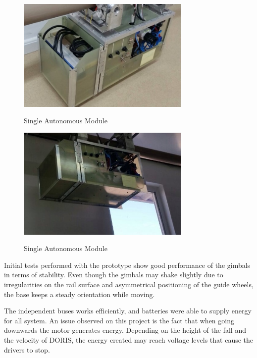 \documentclass{ifacconf}
\begin{document}
\begin{figure}[!h]
\begin{center}
\includegraphics[width=8.4cm]{figs/SAM1.jpg}  %
\label{fig:SAM}
\caption{Single Autonomous Module}
\end{center}
\end{figure}
\begin{figure}[!h]
\begin{center}
\includegraphics[width=8.4cm]{figs/SAM2.jpg}  %
\label{fig:SAM2}
\caption{Single Autonomous Module}
\end{center}
\end{figure}

Initial tests performed with the prototype show good performance of the gimbals
in terms of stability. Even though the gimbals may shake slightly due to
irregularities on the rail surface and asymmetrical positioning of the guide
wheels, the base keeps a steady orientation while moving.

The independent buses works efficiently, and batteries were able to supply
energy for all system. An issue observed on this project
is the fact that when going downwards the motor generates energy. Depending on
the height of the fall and the velocity of DORIS, the energy created may reach
voltage levels that cause the drivers to stop.
\end{document}
